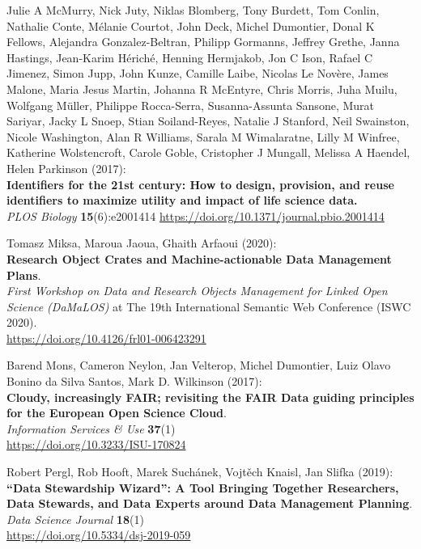 \begin{thebibliography}{9}
 Julie A McMurry, Nick Juty, Niklas Blomberg, Tony
Burdett, Tom Conlin, Nathalie Conte, Mélanie Courtot, John Deck, Michel
Dumontier, Donal K Fellows, Alejandra Gonzalez-Beltran, Philipp
Gormanns, Jeffrey Grethe, Janna Hastings, Jean-Karim Hériché, Henning
Hermjakob, Jon C Ison, Rafael C Jimenez, Simon Jupp, John Kunze, Camille
Laibe, Nicolas Le Novère, James Malone, Maria Jesus Martin, Johanna R
McEntyre, Chris Morris, Juha Muilu, Wolfgang Müller, Philippe
Rocca-Serra, Susanna-Assunta Sansone, Murat Sariyar, Jacky L Snoep,
Stian Soiland-Reyes, Natalie J Stanford, Neil Swainston, Nicole
Washington, Alan R Williams, Sarala M Wimalaratne, Lilly M Winfree,
Katherine Wolstencroft, Carole Goble, Cristopher J Mungall, Melissa A
Haendel, Helen Parkinson (2017):\\
\textbf{Identifiers for the 21st century: How to design, provision, and
reuse identifiers to maximize utility and impact of life science
data.}\\
\emph{PLOS Biology} \textbf{15}(6):e2001414
\url{https://doi.org/10.1371/journal.pbio.2001414}

 Tomasz Miksa, Maroua Jaoua, Ghaith Arfaoui (2020):\\
\textbf{Research Object Crates and Machine-actionable Data Management
Plans}.\\
\emph{First Workshop on Data and Research Objects Management for Linked
Open Science (DaMaLOS)} at The 19th International Semantic Web
Conference (ISWC 2020).\\
\url{https://doi.org/10.4126/frl01-006423291}


 Barend Mons, Cameron Neylon, Jan Velterop, Michel
Dumontier, Luiz Olavo Bonino da Silva Santos, Mark D. Wilkinson
(2017):\\
\textbf{Cloudy, increasingly FAIR; revisiting the FAIR Data guiding
principles for the European Open Science Cloud}.\\
\emph{Information Services \& Use} \textbf{37}(1)\\
\url{https://doi.org/10.3233/ISU-170824}

 Robert Pergl, Rob Hooft, Marek Suchánek, Vojtěch
Knaisl, Jan Slifka (2019):\\
\textbf{``Data Stewardship Wizard'': A Tool Bringing Together
Researchers, Data Stewards, and Data Experts around Data Management
Planning}.\\
\emph{Data Science Journal} \textbf{18}(1)\\
\url{https://doi.org/10.5334/dsj-2019-059}


\end{thebibliography}
